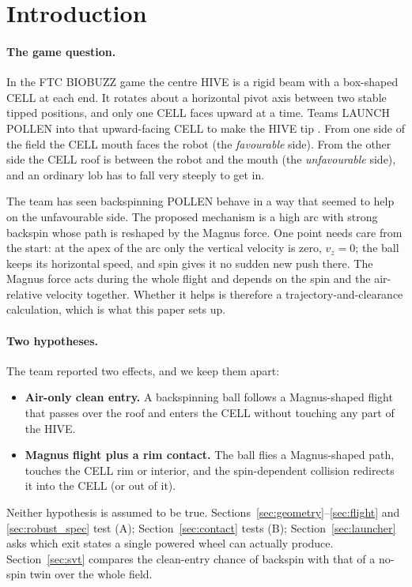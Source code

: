 \documentclass[11pt]{article}
\begin{document}
\tableofcontents

\section{Introduction}
\label{sec:intro}

\paragraph{The game question.}
In the FTC BIOBUZZ game the centre HIVE is a rigid beam with a box-shaped CELL at each end. It
rotates about a horizontal pivot axis between two stable tipped positions, and only one CELL faces
upward at a time. Teams LAUNCH POLLEN into that upward-facing CELL to make the HIVE tip
\cite{manual,gameres}. From one side of the field the CELL mouth faces the robot (the
\emph{favourable} side). From the other side the CELL roof is between the robot and the mouth (the
\emph{unfavourable} side), and an ordinary lob has to fall very steeply to get in.

The team has seen backspinning POLLEN behave in a way that seemed to help on the unfavourable
side. The proposed mechanism is a high arc with strong backspin whose path is reshaped by the
Magnus force. One point needs care from the start: at the apex of the arc only the vertical
velocity is zero, $v_z=0$; the ball keeps its horizontal speed, and spin gives it no sudden new
push there. The Magnus force acts during the whole flight and depends on the spin and the
air-relative velocity together. Whether it helps is therefore a trajectory-and-clearance
calculation, which is what this paper sets up.

\paragraph{Two hypotheses.}
The team reported two effects, and we keep them apart:
\begin{itemize}
  \item[(A)] \textbf{Air-only clean entry.} A backspinning ball follows a Magnus-shaped flight that
    passes over the roof and enters the CELL without touching any part of the HIVE.
  \item[(B)] \textbf{Magnus flight plus a rim contact.} The ball flies a Magnus-shaped path, touches
    the CELL rim or interior, and the spin-dependent collision redirects it into the CELL (or out of
    it).
\end{itemize}
Neither hypothesis is assumed to be true. Sections~\ref{sec:geometry}--\ref{sec:flight} and
\ref{sec:robust_spec} test (A); Section~\ref{sec:contact} tests (B); Section~\ref{sec:launcher}
asks which exit states a single powered wheel can actually produce. Section~\ref{sec:svt} compares
the clean-entry chance of backspin with that of a no-spin twin over the whole field.
\end{document}
